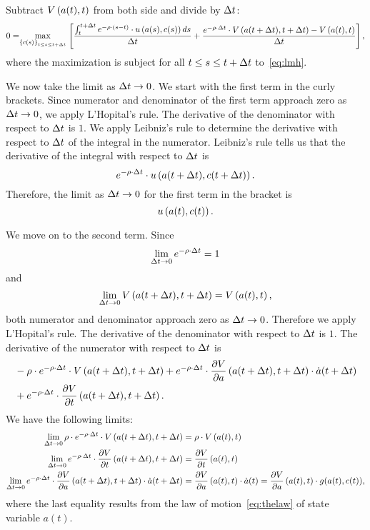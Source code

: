 \documentclass[letterpaper,12pt,leqno]{article}
\begin{document}
Subtract $V\left( a(t),t \right) $ from both side and divide by $\Delta t$:
\begin{align}
0=\underset{\bc{c(s)}_{t\leq s\leq t+\D t}}{\max }\bs{\frac{\int_{t}^{t+\D t}e^{-\r \cdot \bp{ s-t}} \cdot u\bp{
a(s),c(s)} ds}{\D t}+ \frac{e^{-\r  \cdot \D t} \cdot V\bp{ a(t+\D t),t+\D t}-V\bp{ a(t),t}}{\D t} },\label{eq:BIG}
\end{align}
where the maximization is subject for all $t\leq s\leq t+\Delta t$ to~\eqref{eq:lmh}.

We now take the limit as $\Delta t\to 0$. We start with the first term in the curly brackets. Since numerator and denominator of the first term approach zero as $\Delta t\to 0$,  we apply L'Hopital's rule. The derivative of the denominator with respect to $\Delta t$ is $1$. We apply Leibniz's rule to determine the derivative with respect to $\Delta t$ of the integral in the numerator. Leibniz's rule tells us that the derivative of the integral with respect to $\Delta t$ is
\[e^{-\rho \cdot  \Delta t} \cdot u\left( a(t+\Delta t),c(t+\Delta t) \right).\]
Therefore, the limit as $\Delta t\to 0$ for the first term in the bracket is 
\begin{equation}
u\left(  a(t),c(t) \right).\label{eq:BIG1}
\end{equation}


We move on to the second term. Since 
\[\lim_{\Delta t\to 0} e^{-\rho \cdot \Delta t}=1\]
and 
\[\lim_{\Delta t\to 0} V\left(  a(t+\Delta t),t+\Delta t \right) =V\left( a(t),t \right), \]
both numerator and denominator approach zero as $\Delta t\to 0$. Therefore we apply L'Hopital's rule. The derivative of the denominator with respect to $\Delta t$ is $1$. The derivative of the numerator with respect to $\Delta t$ is
\begin{align*}
&-\rho \cdot e^{-\rho\cdot \Delta t}\cdot V\left(  a(t+\Delta t),t+\Delta t \right)+e^{-\rho\cdot \Delta t}\cdot \frac{\partial V}{\partial a}\left(  a(t+\Delta t),t+\Delta t \right) \cdot \dot{a}(t+\Delta t)\\
&+e^{-\rho\cdot \Delta t}\cdot  \frac{\partial V}{\partial t}\left( a(t+\Delta t),t+\Delta t \right). 
\end{align*}
We have the following limits:
\begin{align*}
\lim_{\Delta t\to 0} \rho \cdot e^{-\rho\cdot \Delta t}\cdot V\left(  a(t+\Delta t),t+\Delta t \right)&=\rho \cdot V\left(  a(t),t \right)\\
\lim_{\Delta t\to 0} e^{-\rho\cdot \Delta t}\cdot  \frac{\partial V}{\partial t}\left( a(t+\Delta t),t+\Delta t \right) &= \frac{\partial V}{\partial t}\left( a(t),t \right)\\
\lim_{\Delta t\to 0} e^{-\rho\cdot \Delta t}\cdot \frac{\partial V}{\partial a}\left(  a(t+\Delta t),t+\Delta t \right)\cdot\dot{a}(t+\Delta t)&=\frac{\partial V}{\partial a}\left(  a(t),t \right) \cdot \dot{a}(t)=\frac{\partial V}{\partial a}\left(  a(t),t \right) \cdot g(a(t),c(t)),
\end{align*}
where the last equality results from the law of motion~\eqref{eq:thelaw} of state variable $a(t)$.
\end{document}
